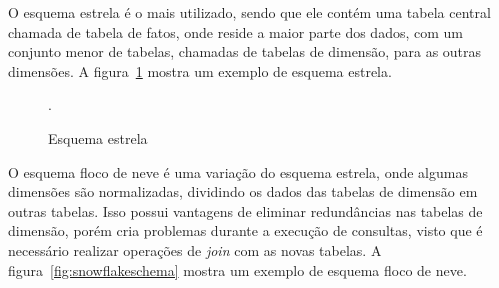 O esquema estrela é o mais utilizado, sendo que ele contém uma tabela central chamada de tabela de fatos, onde reside a maior parte dos dados, com um conjunto menor de tabelas, chamadas de tabelas de dimensão, para as outras dimensões.
A figura~\ref{fig:starschema} mostra um exemplo de esquema estrela.

\begin{figure}[!htb]
	\caption{Esquema estrela}\label{fig:starschema}
	\vspace{6mm}
	\begin{center}
	\end{center}
	\vspace{1mm}
	\legenda{}
	.
\end{figure}

O esquema floco de neve é uma variação do esquema estrela, onde algumas dimensões são normalizadas, dividindo os dados das tabelas de dimensão em outras tabelas.
Isso possui vantagens de eliminar redundâncias nas tabelas de dimensão, porém cria problemas durante a execução de consultas, visto que é necessário realizar operações de \textit{join} com as novas tabelas.
A figura~\ref{fig:snowflakeschema} mostra um exemplo de esquema floco de neve.

